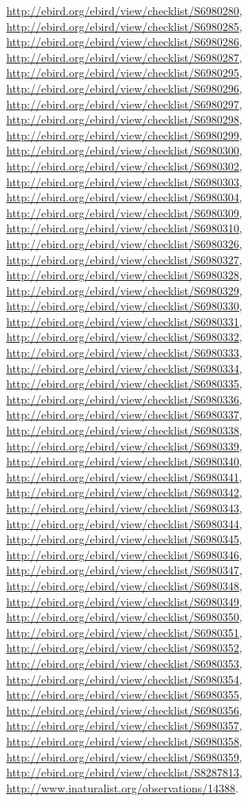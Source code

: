 \documentclass[9pt, article]{memoir}
\begin{document}
\begin{multicols}{2}
\url{http://ebird.org/ebird/view/checklist/S6980280}, 
\url{http://ebird.org/ebird/view/checklist/S6980285}, 
\url{http://ebird.org/ebird/view/checklist/S6980286}, 
\url{http://ebird.org/ebird/view/checklist/S6980287}, 
\url{http://ebird.org/ebird/view/checklist/S6980295}, 
\url{http://ebird.org/ebird/view/checklist/S6980296}, 
\url{http://ebird.org/ebird/view/checklist/S6980297}, 
\url{http://ebird.org/ebird/view/checklist/S6980298}, 
\url{http://ebird.org/ebird/view/checklist/S6980299}, 
\url{http://ebird.org/ebird/view/checklist/S6980300}, 
\url{http://ebird.org/ebird/view/checklist/S6980302}, 
\url{http://ebird.org/ebird/view/checklist/S6980303}, 
\url{http://ebird.org/ebird/view/checklist/S6980304}, 
\url{http://ebird.org/ebird/view/checklist/S6980309}, 
\url{http://ebird.org/ebird/view/checklist/S6980310}, 
\url{http://ebird.org/ebird/view/checklist/S6980326}, 
\url{http://ebird.org/ebird/view/checklist/S6980327}, 
\url{http://ebird.org/ebird/view/checklist/S6980328}, 
\url{http://ebird.org/ebird/view/checklist/S6980329}, 
\url{http://ebird.org/ebird/view/checklist/S6980330}, 
\url{http://ebird.org/ebird/view/checklist/S6980331}, 
\url{http://ebird.org/ebird/view/checklist/S6980332}, 
\url{http://ebird.org/ebird/view/checklist/S6980333}, 
\url{http://ebird.org/ebird/view/checklist/S6980334}, 
\url{http://ebird.org/ebird/view/checklist/S6980335}, 
\url{http://ebird.org/ebird/view/checklist/S6980336}, 
\url{http://ebird.org/ebird/view/checklist/S6980337}, 
\url{http://ebird.org/ebird/view/checklist/S6980338}, 
\url{http://ebird.org/ebird/view/checklist/S6980339}, 
\url{http://ebird.org/ebird/view/checklist/S6980340}, 
\url{http://ebird.org/ebird/view/checklist/S6980341}, 
\url{http://ebird.org/ebird/view/checklist/S6980342}, 
\url{http://ebird.org/ebird/view/checklist/S6980343}, 
\url{http://ebird.org/ebird/view/checklist/S6980344}, 
\url{http://ebird.org/ebird/view/checklist/S6980345}, 
\url{http://ebird.org/ebird/view/checklist/S6980346}, 
\url{http://ebird.org/ebird/view/checklist/S6980347}, 
\url{http://ebird.org/ebird/view/checklist/S6980348}, 
\url{http://ebird.org/ebird/view/checklist/S6980349}, 
\url{http://ebird.org/ebird/view/checklist/S6980350}, 
\url{http://ebird.org/ebird/view/checklist/S6980351}, 
\url{http://ebird.org/ebird/view/checklist/S6980352}, 
\url{http://ebird.org/ebird/view/checklist/S6980353}, 
\url{http://ebird.org/ebird/view/checklist/S6980354}, 
\url{http://ebird.org/ebird/view/checklist/S6980355}, 
\url{http://ebird.org/ebird/view/checklist/S6980356}, 
\url{http://ebird.org/ebird/view/checklist/S6980357}, 
\url{http://ebird.org/ebird/view/checklist/S6980358}, 
\url{http://ebird.org/ebird/view/checklist/S6980359}, 
\url{http://ebird.org/ebird/view/checklist/S8287813}, 
\url{http://www.inaturalist.org/observations/14388}.


\end{multicols}
\end{document}
